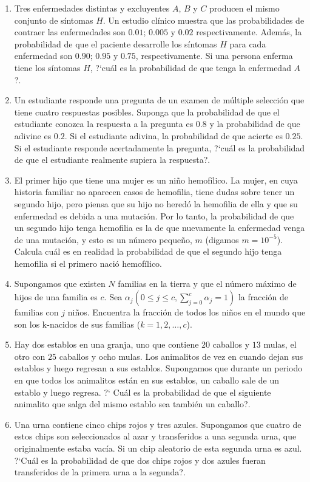 \documentclass[a4paper,10pt]{report}
\begin{document}
\begin{enumerate}
\item Tres enfermedades distintas y excluyentes $A$, $B$ y $C$ producen el mismo conjunto de s\'intomas $H$. Un estudio cl\'inico muestra que las probabilidades de contraer las enfermedades son $0.01$; $0.005$ y $0.02$ respectivamente. Adem\'as, la probabilidad de que el paciente desarrolle los s\'intomas $H$ para cada enfermedad son $0.90$; $0.95$ y $0.75$, respectivamente. Si una persona enferma tiene los s\'intomas $H$, ?`cu\'al es la probabilidad de que tenga la enfermedad $A$?.
\item Un estudiante responde una pregunta de un examen de m\'ultiple selecci\'on que tiene cuatro respuestas posibles. Suponga que la probabilidad de que el estudiante conozca la respuesta a la pregunta es $0.8$ y la probabilidad de que adivine es $0.2$. Si el estudiante adivina, la probabilidad de que acierte es $0.25$. Si el estudiante responde acertadamente la pregunta, ?`cu\'al es la probabilidad de que el estudiante realmente supiera la respuesta?.
\item El primer hijo que tiene una mujer es un ni\~no hemof\'ilico. La mujer, en cuya historia familiar
no aparecen casos de hemofilia, tiene dudas sobre tener un segundo hijo, pero piensa que su hijo
no hered\'o la hemofilia de ella y que su enfermedad es debida a una mutaci\'on. Por lo tanto, la
probabilidad de que un segundo hijo tenga hemofilia es la de que nuevamente la enfermedad venga de una mutaci\'on, y esto es un n\'umero peque\~no, $m$ (digamos $m=10^{-5}$). Calcula cu\'al es en realidad la probabilidad de que el segundo hijo tenga hemofilia si el primero naci\'o hemof\'ilico.
\item Supongamos que existen $N$ familias en la tierra y que el n\'umero m\'aximo de hijos de una familia es $c$. Sea $\alpha_j (0 \leq j \leq c, \displaystyle \sum_{j = 0}^c \alpha_j = 1)$ la fracci\'on de familias con $j$ ni\~nos. Encuentra la fracci\'on de todos los ni\~nos en el mundo que son los k-nacidos  de sus familias ($k =1, 2,\dots, c$).
\item Hay dos establos en una granja, uno que contiene $20$ caballos y $13$ mulas, el otro con $25$ caballos y ocho mulas. Los animalitos  de vez en cuando dejan sus establos y luego regresan a sus establos. Supongamos que durante un periodo en que todos los animalitos est\'an en sus establos, un caballo sale de un establo y luego regresa. ?` Cu\'al es la probabilidad de que el siguiente animalito que salga del mismo establo sea tambi\'en un caballo?.
\item Una urna contiene cinco chips rojos y tres azules. Supongamos que cuatro de estos chips son seleccionados al azar y transferidos a una segunda urna, que originalmente estaba vac\'ia. Si un chip aleatorio de esta segunda urna es azul. ?`Cu\'al es la probabilidad de que dos chips rojos y dos azules fueran transferidos de la primera urna a la segunda?.


\end{enumerate}
\end{document}
